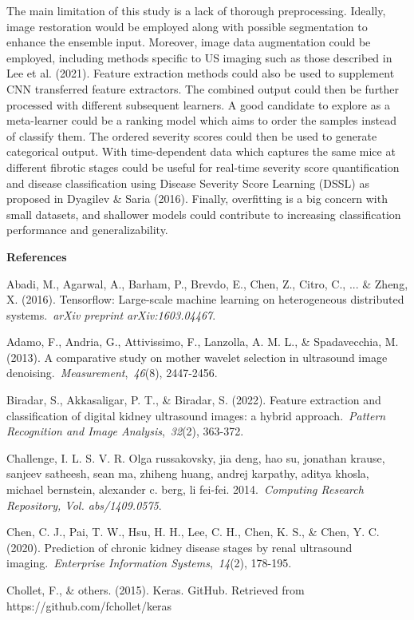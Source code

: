 \documentclass[
]{article}
\begin{document}
The main limitation of this study is a lack of thorough preprocessing.
Ideally, image restoration would be employed along with possible
segmentation to enhance the ensemble input. Moreover, image data
augmentation could be employed, including methods specific to US imaging
such as those described in Lee et al. (2021). Feature extraction methods
could also be used to supplement CNN transferred feature extractors. The
combined output could then be further processed with different
subsequent learners. A good candidate to explore as a meta-learner could
be a ranking model which aims to order the samples instead of classify
them. The ordered severity scores could then be used to generate
categorical output. With time-dependent data which captures the same
mice at different fibrotic stages could be useful for real-time severity
score quantification and disease classification using Disease Severity
Score Learning (DSSL) as proposed in Dyagilev \& Saria (2016). Finally,
overfitting is a big concern with small datasets, and shallower models
could contribute to increasing classification performance and
generalizability.

\textbf{References}

Abadi, M., Agarwal, A., Barham, P., Brevdo, E., Chen, Z., Citro, C., ...
\& Zheng, X. (2016). Tensorflow: Large-scale machine learning on
heterogeneous distributed systems.~\emph{arXiv preprint
arXiv:1603.04467}.

Adamo, F., Andria, G., Attivissimo, F., Lanzolla, A. M. L., \&
Spadavecchia, M. (2013). A comparative study on mother wavelet selection
in ultrasound image denoising.~\emph{Measurement},~\emph{46}(8),
2447-2456.

Biradar, S., Akkasaligar, P. T., \& Biradar, S. (2022). Feature
extraction and classification of digital kidney ultrasound images: a
hybrid approach.~\emph{Pattern Recognition and Image
Analysis},~\emph{32}(2), 363-372.

Challenge, I. L. S. V. R. Olga russakovsky, jia deng, hao su, jonathan
krause, sanjeev satheesh, sean ma, zhiheng huang, andrej karpathy,
aditya khosla, michael bernstein, alexander c. berg, li fei-fei.
2014.~\emph{Computing Research Repository, Vol. abs/1409.0575}.

Chen, C. J., Pai, T. W., Hsu, H. H., Lee, C. H., Chen, K. S., \& Chen,
Y. C. (2020). Prediction of chronic kidney disease stages by renal
ultrasound imaging.~\emph{Enterprise Information Systems},~\emph{14}(2),
178-195.

Chollet, F., \& others. (2015). Keras. GitHub. Retrieved from
https://github.com/fchollet/keras
\end{document}
